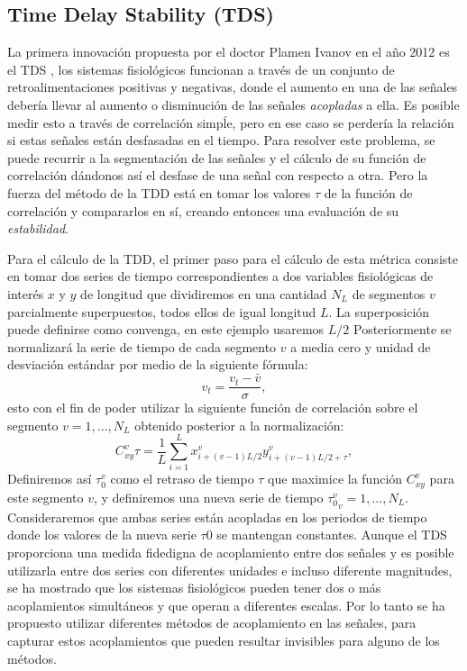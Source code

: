 \documentclass[twoside,twocolumn]{article}
\begin{document}
\subsection{Time Delay Stability (TDS)}
La primera innovación propuesta por el doctor Plamen Ivanov en el año 2012 es el TDS \cite{bashan2012network}, los sistemas fisiológicos funcionan a través de un conjunto de retroalimentaciones positivas y negativas, donde el aumento en una de las señales debería llevar al aumento o disminución de las señales \textit{acopladas} a ella. Es posible medir esto a través de correlación simpĺe, pero en ese caso se perdería la relación si estas señales están desfasadas en el tiempo.
Para resolver este problema, se puede recurrir a la segmentación de las señales y el cálculo de su función de correlación dándonos así el desfase de una señal con respecto a otra. Pero la fuerza del método de la TDD está en tomar los valores $\tau$ de la función de correlación y compararlos en sí, creando entonces una evaluación de su \textit{estabilidad}.

Para el cálculo de la TDD, el primer paso para el cálculo de esta métrica consiste en tomar dos series de tiempo correspondientes a dos variables fisiológicas de interés $x$ y $y$ de longitud que dividiremos en una cantidad $N_L$ de segmentos $v$ parcialmente superpuestos, todos ellos de igual longitud $L$.
La superposición puede definirse como convenga, en este ejemplo usaremos $L/2$
Posteriormente se normalizará la serie de tiempo de cada segmento $v$ a media cero y unidad de desviación estándar por medio de la siguiente fórmula:
\begin{equation}
  v_t = \frac{v_t-\bar{v}}{\sigma} ,
\end{equation}
esto con el fin de poder utilizar la siguiente función de correlación sobre el segmento $v = 1,...,N_L$ obtenido posterior a la normalización:
\begin{equation}
  C^v_{xy}\tau=\frac{1}{L}\sum^L_{i=1}x^v_{i+(v-1)L/2}y^v_{i+(v-1)L/2+\tau} ,
\end{equation}
Definiremos así $\tau^v_0$ como el retraso de tiempo $\tau$ que maximice la función $C^v_{xy}$ para este segmento $v$, y definiremos una nueva serie de tiempo ${\tau^v_0}_v=1,...,N_L$.
Consideraremos que ambas series están acopladas en los periodos de tiempo donde los valores de la nueva serie $\tau0$ se mantengan constantes.
Aunque el TDS proporciona una medida fidedigna de acoplamiento entre dos señales y es posible utilizarla entre dos series con diferentes unidades e incluso diferente magnitudes, se ha mostrado que los sistemas fisiológicos pueden tener dos o más acoplamientos simultáneos y que operan a diferentes escalas.
Por lo tanto se ha propuesto utilizar diferentes métodos de acoplamiento en las señales, para capturar estos acoplamientos que pueden resultar invisibles para alguno de los métodos.
\end{document}
